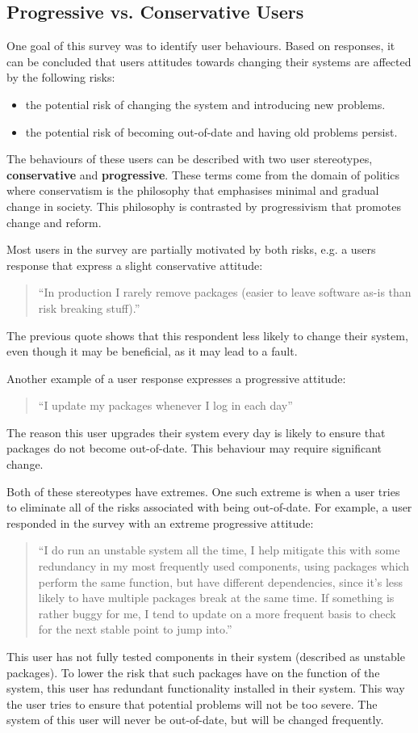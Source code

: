 \subsection{Progressive vs. Conservative Users}
One goal of this survey was to identify user behaviours.
Based on responses, it can be concluded that users attitudes towards changing their systems are affected by the following risks:
\begin{itemize}
  \item the potential risk of changing the system and introducing new problems.
  \item the potential risk of becoming out-of-date and having old problems persist.
\end{itemize}
The behaviours of these users can be described with two user stereotypes, \textbf{conservative} and \textbf{progressive}.
These terms come from the domain of politics where conservatism is the philosophy that emphasises minimal and gradual change in society. %
This philosophy is contrasted by progressivism that promotes change and reform. %

Most users in the survey are partially motivated by both risks, e.g. a users response that express a slight conservative attitude:
\begin{quotation}
``In production I rarely remove packages (easier to leave software as-is than risk breaking stuff).''
\end{quotation}
The previous quote shows that this respondent less likely to change their system, even though it may be beneficial, as it may lead to a fault. 

Another example of a user response expresses a progressive attitude:
\begin{quotation}
``I update my packages whenever I log in each day''
\end{quotation}
The reason this user upgrades their system every day is likely to ensure that packages do not become out-of-date.
This behaviour may require significant change.

Both of these stereotypes have extremes.
One such extreme is when a user tries to eliminate all of the risks associated with being out-of-date.
For example, a user responded in the survey with an extreme progressive attitude:
\begin{quotation}
``I do run an unstable system all the time, I help mitigate this with some redundancy in my most frequently used components, 
using packages which perform the same function, but have different dependencies, since it's less likely to have multiple packages break at the same time. 
If something is rather buggy for me, I tend to update on a more frequent basis to check for the next stable point to jump into.''
\end{quotation}
This user has not fully tested components in their system (described as unstable packages).
To lower the risk that such packages have on the function of the system, this user has redundant functionality installed in their system.
This way the user tries to ensure that potential problems will not be too severe.
The system of this user will never be out-of-date, but will be changed frequently.

